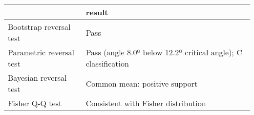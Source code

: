 \begin{tabular}{ll}
\toprule
{} &                                                          result \\
\midrule
Bootstrap reversal test  &                                                            Pass \\
Parametric reversal test &  Pass (angle 8.0º below 12.2º critical angle); C classification \\
Bayesian reversal test   &                                   Common mean: positive support \\
Fisher Q-Q test          &                             Consistent with Fisher distribution \\
\bottomrule
\end{tabular}
